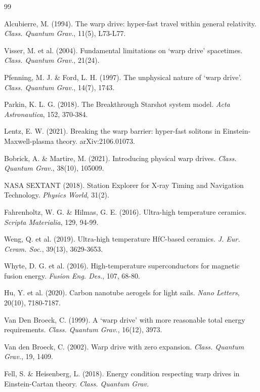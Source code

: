 \documentclass[11pt,a4paper,onecolumn]{article}
\begin{document}

\begin{thebibliography}{99}

 Alcubierre, M. (1994). The warp drive: hyper-fast travel within general relativity. \textit{Class. Quantum Grav.}, 11(5), L73-L77.

 Visser, M. et al. (2004). Fundamental limitations on `warp drive' spacetimes. \textit{Class. Quantum Grav.}, 21(24).

 Pfenning, M. J. \& Ford, L. H. (1997). The unphysical nature of `warp drive'. \textit{Class. Quantum Grav.}, 14(7), 1743.

 Parkin, K. L. G. (2018). The Breakthrough Starshot system model. \textit{Acta Astronautica}, 152, 370-384.

 Lentz, E. W. (2021). Breaking the warp barrier: hyper-fast solitons in Einstein-Maxwell-plasma theory. arXiv:2106.01073.

 Bobrick, A. \& Martire, M. (2021). Introducing physical warp drives. \textit{Class. Quantum Grav.}, 38(10), 105009.

 NASA SEXTANT (2018). Station Explorer for X-ray Timing and Navigation Technology. \textit{Physics World}, 31(2).

 Fahrenholtz, W. G. \& Hilmas, G. E. (2016). Ultra-high temperature ceramics. \textit{Scripta Materialia}, 129, 94-99.

 Weng, Q. et al. (2019). Ultra-high temperature HfC-based ceramics. \textit{J. Eur. Ceram. Soc.}, 39(13), 3629-3653.

 Whyte, D. G. et al. (2016). High-temperature superconductors for magnetic fusion energy. \textit{Fusion Eng. Des.}, 107, 68-80.

 Hu, Y. et al. (2020). Carbon nanotube aerogels for light sails. \textit{Nano Letters}, 20(10), 7180-7187.

 Van Den Broeck, C. (1999). A `warp drive' with more reasonable total energy requirements. \textit{Class. Quantum Grav.}, 16(12), 3973.

 Van den Broeck, C. (2002). Warp drive with zero expansion. \textit{Class. Quantum Grav.}, 19, 1409.

 Fell, S. \& Heisenberg, L. (2018). Energy condition respecting warp drives in Einstein-Cartan theory. \textit{Class. Quantum Grav.}


\end{thebibliography}
\end{document}
